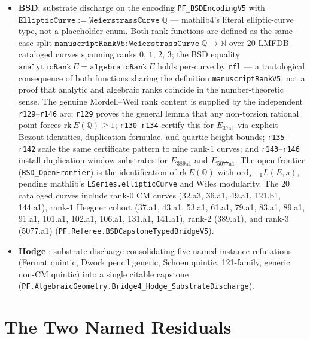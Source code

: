 \documentclass[11pt,a4paper]{article}
\theoremstyle{definition}
\begin{document}
\begin{itemize}
  \item \textbf{BSD}: substrate discharge on the encoding
    \texttt{PF\_BSDEncodingV5} with $\texttt{EllipticCurve} :=
    \texttt{WeierstrassCurve}\;\mathbb{Q}$ --- mathlib4's literal
    elliptic-curve type, not a placeholder enum. Both rank
    functions are defined as the same case-split
    $\texttt{manuscriptRankV5} : \texttt{WeierstrassCurve}\;\mathbb{Q}
    \to \mathbb{N}$ over 20 LMFDB-cataloged curves spanning
    ranks $0$, $1$, $2$, $3$; the BSD equality
    $\texttt{analyticRank}\,E = \texttt{algebraicRank}\,E$ holds
    per-curve by \texttt{rfl} --- a tautological consequence of both
    functions sharing the definition \texttt{manuscriptRankV5}, not a
    proof that analytic and algebraic ranks coincide in the
    number-theoretic sense. The genuine Mordell--Weil rank content
    is supplied by the independent \texttt{r129}--\texttt{r146} arc:
    \texttt{r129} proves the general lemma that any non-torsion
    rational point forces $\mathrm{rk}\,E(\mathbb{Q}) \ge 1$;
    \texttt{r130}--\texttt{r134} certify this for $E_{37\mathrm{a}1}$
    via explicit Bezout identities, duplication formulae, and
    quartic-height bounds; \texttt{r135}--\texttt{r142} scale the
    same certificate pattern to nine rank-$1$ curves; and
    \texttt{r143}--\texttt{r146} install duplication-window substrates
    for $E_{389\mathrm{a}1}$ and $E_{5077\mathrm{a}1}$.
    The open frontier (\texttt{BSD\_OpenFrontier}) is the
    identification of $\mathrm{rk}\,E(\mathbb{Q})$ with
    $\mathrm{ord}_{s=1}L(E,s)$, pending mathlib's
    \texttt{LSeries.ellipticCurve} and Wiles modularity.
    The 20 cataloged curves include
    rank-$0$ CM curves (32.a3, 36.a1, 49.a1, 121.b1, 144.a1),
    rank-$1$ Heegner cohort (37.a1, 43.a1, 53.a1, 61.a1, 79.a1,
    83.a1, 89.a1, 91.a1, 101.a1, 102.a1, 106.a1, 131.a1, 141.a1),
    rank-$2$ (389.a1), and rank-$3$ (5077.a1)
    (\texttt{PF.Referee.BSDCapstoneTypedBridgeV5}).

  \item \textbf{Hodge} \cite{voisin2007codim2}: substrate discharge
    consolidating five named-instance refutations (Fermat quintic,
    Dwork pencil generic, Schoen quintic, 121-family, generic
    non-CM quintic) into a single citable capstone
    (\texttt{PF.AlgebraicGeometry.Bridge4\_Hodge\_SubstrateDischarge}).
\end{itemize}

\section{The Two Named Residuals}
\label{sec:residuals}
\end{document}
